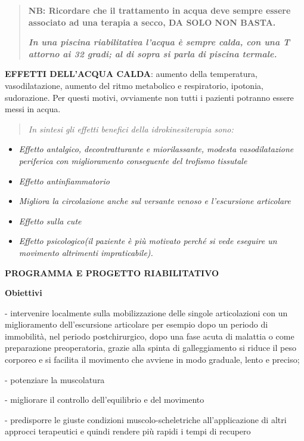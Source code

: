 \documentclass[]{article}
\begin{document}
\begin{quote}
\textbf{NB: Ricordare che il trattamento in acqua deve sempre essere
associato ad una terapia a secco, DA SOLO NON BASTA.}

\textbf{\emph{In una piscina riabilitativa l'acqua è sempre calda, con
una T attorno ai 32 gradi; al di sopra si parla} \emph{di piscina
termale.}}
\end{quote}

\textbf{EFFETTI DELL'ACQUA CALDA}: aumento della temperatura,
vasodilatazione, aumento del ritmo metabolico e respiratorio, ipotonia,
sudorazione. Per questi motivi, ovviamente non tutti i pazienti potranno
essere messi in acqua.

\begin{quote}
\emph{In sintesi gli effetti benefici della idrokinesiterapia sono:}
\end{quote}

\begin{itemize}
\item
  \emph{Effetto antalgico, decontratturante e miorilassante, modesta
  vasodilatazione periferica con miglioramento conseguente del trofismo
  tissutale}
\item
  \emph{Effetto antinfiammatorio}
\item
  \emph{Migliora la circolazione anche sul versante venoso e
  l'escursione articolare}
\item
  \emph{Effetto sulla cute}
\item
  \emph{Effetto psicologico(il paziente è più motivato perché si vede
  eseguire un movimento altrimenti impraticabile).}
\end{itemize}

\textbf{PROGRAMMA E PROGETTO RIABILITATIVO}

\textbf{Obiettivi}

- intervenire localmente sulla mobilizzazione delle singole
articolazioni con un miglioramento dell'escursione articolare per
esempio dopo un periodo di immobilità, nel periodo postchirurgico, dopo
una fase acuta di malattia o come preparazione preoperatoria, grazie
alla spinta di galleggiamento si riduce il peso corporeo e si facilita
il movimento che avviene in modo graduale, lento e preciso;

- potenziare la muscolatura

- migliorare il controllo dell'equilibrio e del movimento

- predisporre le giuste condizioni muscolo-scheletriche all'applicazione
di altri approcci terapeutici e quindi rendere più rapidi i tempi di
recupero
\end{document}
